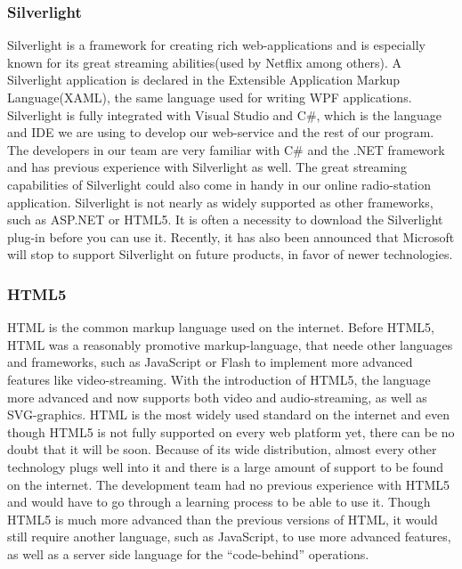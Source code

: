 \documentclass[a4paper,11pt,report]{article}
\begin{document}
\subsubsection{Silverlight}
Silverlight is a framework for creating rich web-applications and is especially known for its great streaming abilities(used by Netflix among others). A Silverlight application is declared in the Extensible Application Markup Language(XAML), the same language used for writing WPF applications.  Silverlight is fully integrated with Visual Studio and C\#, which is the language and IDE we are using to develop our web-service and the rest of our program. The developers in our team are very familiar with C\# and the .NET framework and has previous experience with Silverlight as well. The great streaming capabilities of Silverlight could also come in handy in our online radio-station application. Silverlight is not nearly as widely supported as other frameworks, such as ASP.NET or HTML5. It is often a necessity to download the Silverlight plug-in before you can use it. Recently, it has also been announced that Microsoft will stop to support Silverlight on future products, in favor of newer technologies.

\subsubsection{HTML5}

HTML is the common markup language used on the internet. Before HTML5, HTML was a reasonably promotive markup-language, that neede other languages and frameworks, such as JavaScript or Flash to implement more advanced features like video-streaming. With the introduction of HTML5, the language more advanced and now supports both video and audio-streaming, as well as SVG-graphics. HTML is the most widely used standard on the internet and even though HTML5 is not fully supported on every web platform yet, there can be no doubt that it will be soon. Because of its wide distribution, almost every other technology plugs well into it and there is a large amount of support to be found on the internet. The development team had no previous experience with HTML5 and would have to go through a learning process to be able to use it. Though HTML5 is much more advanced than the previous versions of HTML, it would still require another language, such as JavaScript, to use more advanced features, as well as a server side language for the “code-behind” operations.
\end{document}
